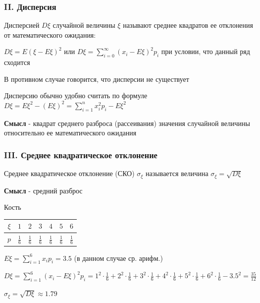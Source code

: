 \documentclass[12pt]{article}
\begin{document}
    \subsubsection{II. Дисперсия}

    \Defs Дисперсией $D\xi$ случайной величины $\xi$ называют среднее квадратов ее отклонения от математического ожидания:

    $D\xi = E (\xi - E\xi)^2$ или $D\xi = \sum_{i = 0}^\infty (x_i - E\xi)^2 p_i$ при условии, что данный ряд сходится

    В противном случае говорится, что дисперсии не существует

    \Nota Дисперсию обычно удобно считать по формуле $D\xi = E\xi^2 - (E\xi)^2 = \sum_{i = 1}^n x^2_i p_i - E\xi^2$

    \textbf{Смысл} - квадрат среднего разброса (рассеивания) значения случайной величины относительно ее математического
    ожидания

    \subsubsection{III. Среднее квадратическое отклонение}

    \Defs Среднее квадратическое отклонение (СКО) $\sigma_\xi$ называется величина $\sigma_\xi = \sqrt{D\xi}$

    \textbf{Смысл} - средний разброс

     Кость

    \smallvspace


    \begin{tabular}{c|c|c|c|c|c|c}
        $\xi$ & $1$           & $2$           & $3$           & $4$           & $5$           & $6$           \\
        \hline
        $p$   & $\frac{1}{6}$ & $\frac{1}{6}$ & $\frac{1}{6}$ & $\frac{1}{6}$ & $\frac{1}{6}$ & $\frac{1}{6}$
    \end{tabular}


    $E\xi = \sum_{i = 1}^6 x_i p_i = 3.5$ (в данном случае ср. арифм.)

    $D\xi = \sum_{i = 1}^6 (x_i - E\xi)^2 p_i = 1^2 \cdot \frac{1}{6} + 2^2 \cdot \frac{1}{6} + 3^2 \cdot \frac{1}{6} + 4^2 \cdot \frac{1}{6} + 5^2 \cdot \frac{1}{6} + 6^2 \cdot \frac{1}{6} - 3.5^2 = \frac{35}{12} $

    $\sigma_\xi = \sqrt{D\xi} \approx 1.79$
\end{document}
